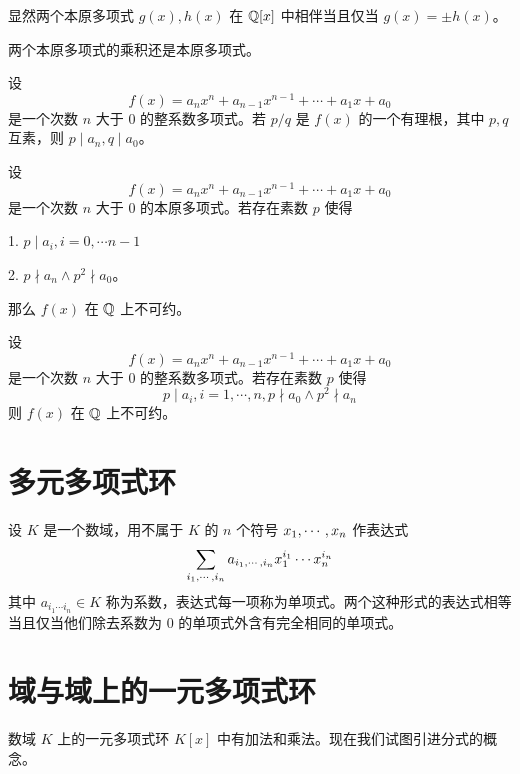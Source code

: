 显然两个本原多项式 $g(x), h(x)$ 在 $\mathbb{Q}[x]$ 中相伴当且仅当 $g(x) = \pm h(x)$。

\begin{theorem}[Gauss 引理]
    两个本原多项式的乘积还是本原多项式。
\end{theorem}

\begin{theorem}
    设
    \[ f(x) = a_nx^n + a_{n-1}x^{n-1} + \cdots + a_1x + a_0\]
    是一个次数 $n$ 大于 $0$ 的整系数多项式。若 $p/q$ 是 $f(x)$ 的一个有理根，其中 $p,q$ 互素，则 $p \mid a_n, q \mid a_0$。
\end{theorem}

\begin{theorem}
    设
    \[ f(x) = a_nx^n + a_{n-1}x^{n-1} + \cdots + a_1x + a_0\]
    是一个次数 $n$ 大于 $0$ 的本原多项式。若存在素数 $p$ 使得
    
    1. $p \mid a_i, i = 0,\cdots n-1$
    
    2. $p \nmid a_n \land p^2 \nmid a_0$。
    
    那么 $f(x)$ 在 $\mathbb{Q}$ 上不可约。
\end{theorem}

\begin{theorem}
    设
    \[ f(x) = a_nx^n + a_{n-1}x^{n-1} + \cdots + a_1x + a_0\]
    是一个次数 $n$ 大于 $0$ 的整系数多项式。若存在素数 $p$ 使得
    \[ p \mid a_i, i = 1,\cdots,n, p \nmid a_0 \land  p^2 \nmid a_n \]
    则 $f(x)$ 在 $\mathbb{Q}$ 上不可约。
\end{theorem}

\section{多元多项式环}

\begin{definition}
    设 $K$ 是一个数域，用不属于 $K$ 的 $n$ 个符号 $x_1,\cdots,x_n$ 作表达式
    \[ \sum_{i_1,\cdots,i_n}a_{i_1,\cdots,i_n} x_1^{i_1}\cdots x_n^{i_n} \]
    其中 $a_{i_1\cdots i_n} \in K$ 称为系数，表达式每一项称为单项式。两个这种形式的表达式相等当且仅当他们除去系数为 $0$ 的单项式外含有完全相同的单项式。
\end{definition}

\section{域与域上的一元多项式环}

数域 $K$ 上的一元多项式环 $K[x]$ 中有加法和乘法。现在我们试图引进分式的概念。

